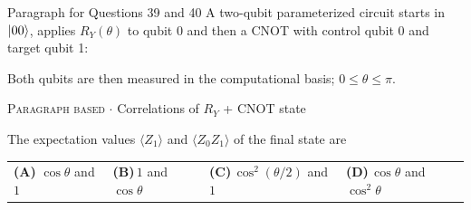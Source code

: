 \documentclass[11pt,a4paper]{article}
\newcommand{\optlabel}[1]{\textbf{(#1)}}
\newcommand{\correctlabel}[1]{\textcolor{okgreen}{\textbf{(#1)}\,\ding{51}}}
\newenvironment{qitem}[1]{\begin{list}{}{\setlength{\leftmargin}{3.3em}\setlength{\labelwidth}{3.1em}%
  \setlength{\labelsep}{0.2em}\setlength{\topsep}{3pt}\setlength{\parsep}{3pt}}\item[\textbf{Q.#1}\hfill]}{\end{list}}
\newcommand{\qmeta}[2]{{\footnotesize\color{black!60}\textsc{#1} \;$\cdot$\; #2}\par}
\begin{document}
\begin{passagebox}{Paragraph for Questions 39 and 40}
A two-qubit parameterized circuit starts in $\ket{00}$, applies $R_Y(\theta)$ to qubit 0 and then a CNOT with
control qubit 0 and target qubit 1:
\begin{center}
\end{center}
Both qubits are then measured in the computational basis; $0 \le \theta \le \pi$.
\end{passagebox}
\begin{qitem}{39}
\qmeta{Paragraph based}{Correlations of $R_Y$ + CNOT state}
The expectation values $\langle Z_1\rangle$ and $\langle Z_0Z_1\rangle$ of the final state are
\par\smallskip\noindent\begin{tabularx}{\linewidth}{@{}*{4}{L}@{}}
\correctlabel{A}\,$\cos\theta$ and $1$ & \optlabel{B}\,$1$ and $\cos\theta$ & \optlabel{C}\,$\cos^2(\theta/2)$ and $1$ & \optlabel{D}\,$\cos\theta$ and $\cos^2\theta$
\end{tabularx}
\end{qitem}
\end{document}
